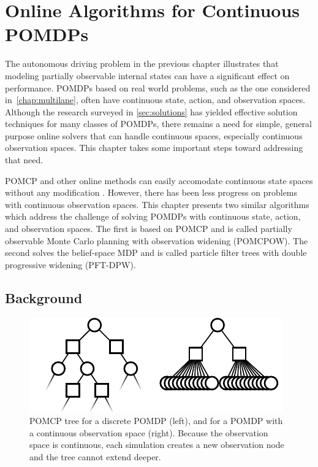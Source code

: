 \chapter{Online Algorithms for Continuous POMDPs} \label{chap:pomcpow}

The autonomous driving problem in the previous chapter illustrates that modeling partially observable internal states can have a significant effect on performance.
POMDPs based on real world problems, such as the one considered in~\cref{chap:multilane}, often have continuous state, action, and observation spaces.
Although the research surveyed in \cref{sec:solutions} has yielded effective solution techniques for many classes of POMDPs, there remains a need for simple, general purpose online solvers that can handle continuous spaces, especially continuous observation spaces.
This chapter takes some important steps toward addressing that need.

POMCP and other online methods can easily accomodate continuous state spaces without any modification \cite{goldhoorn2014continuous}.
However, there has been less progress on problems with continuous observation spaces.
This chapter presents two similar algorithms which address the challenge of solving POMDPs with continuous state, action, and observation spaces.
The first is based on POMCP and is called partially observable Monte Carlo planning with observation widening (POMCPOW). 
The second solves the belief-space MDP and is called particle filter trees with double progressive widening (PFT-DPW).

\section{Background}

\begin{figure}[htb]
\begin{center}
    \includegraphics[width=0.9\columnwidth]{media/continuous_tree.pdf}
\end{center}
\caption[POMCP tree on a continuous observation space]{POMCP tree for a discrete POMDP (left), and for a POMDP with a continuous observation space (right). Because the observation space is continuous, each simulation creates a new observation node and the tree cannot extend deeper.}
\label{fig:ctree}
\end{figure}

